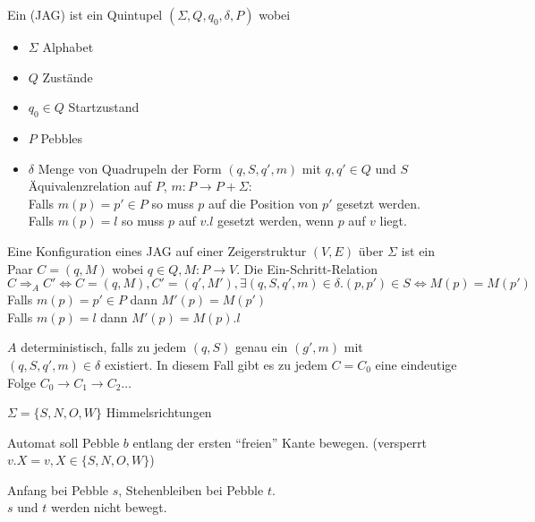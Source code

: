 \begin{definition}
    
    Ein  (JAG) ist ein Quintupel $(\Sigma, Q, q_0, \delta, P)$ wobei 
    \begin{itemize}
        \item $\Sigma$ Alphabet
        \item $Q$ Zustände
        \item $q_0 \in Q$ Startzustand
        \item $P$ Pebbles
        \item $\delta$ Menge von Quadrupeln der Form $(q, S, q', m)$ 
                mit $q, q' \in Q$ 
                und $S$ Äquivalenzrelation auf $P$, $m: P \rightarrow P + \Sigma$:
                \\
                Falls $m(p) = p' \in P$ so muss $p$ auf die Position von $p'$ gesetzt werden.
                \\
                Falls $m(p) = l$ so muss $p$ auf $v.l$ gesetzt werden, wenn $p$ auf $v$ liegt.
    \end{itemize}

    Eine Konfiguration eines JAG auf einer Zeigerstruktur $(V, E)$ über $\Sigma$ ist ein Paar $C = (q, M)$ wobei $q \in Q, M: P \rightarrow V$.
    Die Ein-Schritt-Relation $C \Rightarrow_A C' \Longleftrightarrow   C = (q, M), C' = (q', M'), \exists (q, S, q', m) \in \delta . 
    (p, p') \in S \Leftrightarrow M(p) = M(p')
    $
    Falls $m(p) = p' \in P$ dann $M'(p) = M(p')$\\
    Falls $m(p) = l$ dann $M'(p) = M(p).l$

    $A$ deterministisch, falls zu jedem $(q, S)$ genau ein $(g', m)$ mit $(q, S, q', m) \in \delta$ existiert. In diesem Fall gibt es zu jedem $C = C_0$ eine eindeutige Folge $C_0 \rightarrow C_1 \rightarrow C_2 \dots$

\end{definition}


\begin{beispiel}
    
    $\Sigma = \{ S, N, O, W \}$ Himmelsrichtungen

    Automat soll Pebble $b$ entlang der ersten ``freien'' Kante bewegen. 
    (versperrt $v.X = v, X \in \{ S, N, O, W \}$)

    Anfang bei Pebble $s$, Stehenbleiben bei Pebble $t$.
    \\
    $s$ und $t$ werden nicht bewegt.

\end{beispiel}



